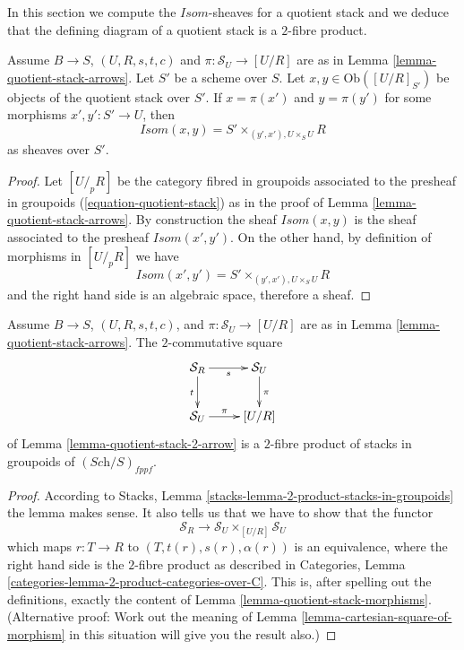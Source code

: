 \noindent
In this section we compute the $\mathit{Isom}$-sheaves for a quotient stack
and we deduce that the defining diagram of a quotient stack is a
$2$-fibre product.

\begin{lemma}
\label{lemma-quotient-stack-morphisms}
Assume $B \to S$, $(U, R, s, t, c)$ and $\pi : \mathcal{S}_U \to [U/R]$
are as in
Lemma \ref{lemma-quotient-stack-arrows}.
Let $S'$ be a scheme over $S$.
Let $x, y \in \text{Ob}([U/R]_{S'})$ be objects of the
quotient stack over $S'$. If $x = \pi(x')$ and $y = \pi(y')$ for
some morphisms $x', y' : S' \to U$, then
$$
\mathit{Isom}(x, y) = S' \times_{(y', x'), U \times_S U} R
$$
as sheaves over $S'$.
\end{lemma}

\begin{proof}
Let $[U/_{\!p}R]$ be the category fibred in groupoids associated to
the presheaf in groupoids (\ref{equation-quotient-stack}) as in the proof of
Lemma \ref{lemma-quotient-stack-arrows}.
By construction the sheaf $\mathit{Isom}(x, y)$ is the sheaf associated
to the presheaf $\mathit{Isom}(x', y')$. On the other hand, by definition
of morphisms in $[U/_{\!p}R]$ we have
$$
\mathit{Isom}(x', y') = S' \times_{(y', x'), U \times_S U} R
$$
and the right hand side is an algebraic space, therefore a sheaf.
\end{proof}

\begin{lemma}
\label{lemma-quotient-stack-2-cartesian}
Assume $B \to S$, $(U, R, s, t, c)$, and $\pi : \mathcal{S}_U \to [U/R]$
are as in
Lemma \ref{lemma-quotient-stack-arrows}.
The $2$-commutative square
$$
\xymatrix{
\mathcal{S}_R \ar[r]_s \ar[d]_t & \mathcal{S}_U \ar[d]^\pi \\
\mathcal{S}_U \ar[r]^-\pi & [U/R]
}
$$
of
Lemma \ref{lemma-quotient-stack-2-arrow}
is a $2$-fibre product of stacks in groupoids of $(\textit{Sch}/S)_{fppf}$.
\end{lemma}

\begin{proof}
According to
Stacks, Lemma \ref{stacks-lemma-2-product-stacks-in-groupoids}
the lemma makes sense. It also tells us that we have to show that
the functor
$$
\mathcal{S}_R \longrightarrow \mathcal{S}_U \times_{[U/R]} \mathcal{S}_U
$$
which maps $r : T \to R$ to $(T, t(r), s(r), \alpha(r))$ is an equivalence,
where the right hand side is the $2$-fibre product as described in
Categories, Lemma \ref{categories-lemma-2-product-categories-over-C}.
This is, after spelling out the definitions, exactly the content of
Lemma \ref{lemma-quotient-stack-morphisms}. (Alternative proof: Work out
the meaning of
Lemma \ref{lemma-cartesian-square-of-morphism}
in this situation will give you the result also.)
\end{proof}

